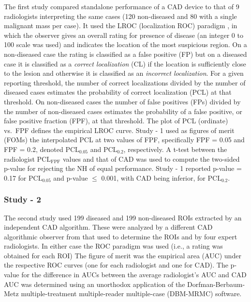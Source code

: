 \documentclass[
]{book}
\begin{document}
The first study \citep{hupse2013standalone} compared standalone performance of a CAD device to that of 9 radiologists interpreting the same cases (120 non-diseased and 80 with a single malignant mass per case). It used the LROC (localization ROC) paradigm \citep{starr1975visual, metz1976observer, swensson1996unified}, in which the observer gives an overall rating for presence of disease (an integer 0 to 100 scale was used) and indicates the location of the most suspicious region. On a non-diseased case the rating is classified as a false positive (FP) but on a diseased case it is classified as a \emph{correct localization} (CL) if the location is sufficiently close to the lesion and otherwise it is classified as an \emph{incorrect localization}. For a given reporting threshold, the number of correct localizations divided by the number of diseased cases estimates the probability of correct localization (PCL) at that threshold. On non-diseased cases the number of false positives (FPs) divided by the number of non-diseased cases estimates the probability of a false positive, or false positive fraction (FPF), at that threshold. The plot of PCL (ordinate) vs.~FPF defines the empirical LROC curve. Study - 1 used as figures of merit (FOMs) the interpolated PCL at two values of FPF, specifically FPF = 0.05 and FPF = 0.2, denoted \(\text{PCL}_{0.05}\) and \(\text{PCL}_{0.2}\), respectively. A t-test between the radiologist \(\text{PCL}_{\text{FPF}}\) values and that of CAD was used to compute the two-sided p-value for rejecting the NH of equal performance. Study - 1 reported p-value = 0.17 for \(\text{PCL}_{0.05}\) and p-value \(\leq\) 0.001, with CAD being inferior, for \(\text{PCL}_{0.2}\).

\hypertarget{standalone-cad-radiologists-study2}{%
\subsubsection{Study - 2}\label{standalone-cad-radiologists-study2}}

The second study \citep{kooi2016comparison} used 199 diseased and 199 non-diseased ROIs extracted by an independent CAD algorithm. These were analyzed by a different CAD algorithmic observer from that used to determine the ROIs and by four expert radiologists. In either case the ROC paradigm was used (i.e., a rating was obtained for each ROI) The figure of merit was the empirical area (AUC) under the respective ROC curves (one for each radiologist and one for CAD). The p-value for the difference in AUCs between the average radiologist's AUC and CAD AUC was determined using an unorthodox application of the Dorfman-Berbaum-Metz \citep{dorfman1992receiver} multiple-treatment multiple-reader multiple-case (DBM-MRMC) software.
\end{document}
